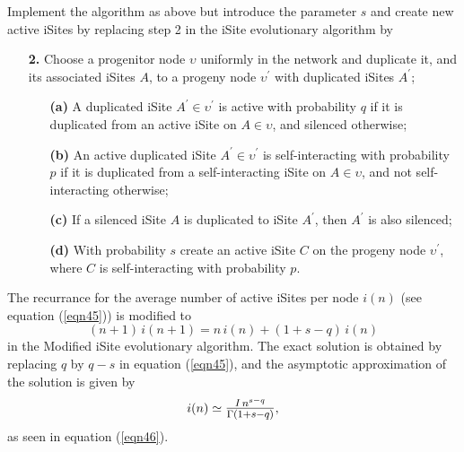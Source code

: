 \documentclass[12pt]{iopart}
\def\Sfrac#1#2{\hbox{\large$\frac{#1}{#2}$}}
\def\Ref#1{(\ref{#1})}
\begin{document}
\vspace{1mm}
Implement the algorithm as above but introduce the parameter $s$ and create 
new active iSites by replacing step 2 in the iSite evolutionary algorithm by 
\begin{itemize}
\item[\bf 2.] Choose a progenitor node $\upsilon$ uniformly in the network and duplicate it, and its
associated iSites $A$, to a progeny node $\upsilon^\prime$ with duplicated iSites $A^\prime$;
\begin{itemize}
\item[\bf (a)] A duplicated iSite $A^\prime\in\upsilon^\prime$ is active with probability $q$
if it is duplicated from an active iSite on $A\in\upsilon$, and silenced otherwise;
\item[\bf (b)] An active duplicated iSite $A^\prime\in\upsilon^\prime$ is self-interacting with probability
$p$ if it is duplicated from a self-interacting iSite on $A\in\upsilon$, and not self-interacting
otherwise;
\item[\bf (c)] If a silenced iSite $A$ is duplicated to iSite $A^\prime$, then $A^\prime$ is also silenced;
\item[\bf (d)] With probability $s$ create an active iSite $C$ on the progeny 
node $\upsilon^\prime$, where $C$ is self-interacting with probability $p$.
\end{itemize}
\end{itemize}

The recurrance for the average number of active iSites per node $i(n)$ (see equation
\Ref{eqn45}) is modified to
\begin{equation}
(n+1)\,i(n+1) = n\,i(n) + (1+s-q)\, i(n) 
\end{equation} 
in the Modified iSite evolutionary algorithm.  The exact solution is obtained by replacing 
$q$ by $q-s$ in equation \Ref{eqn45}, and the asymptotic approximation of the
solution is given by
\begin{equation}
i(n) \simeq \Sfrac{I\, n^{s-q}}{\Gamma(1+s-q)} ,
\end{equation}
as seen in equation \Ref{eqn46}.
\end{document}
